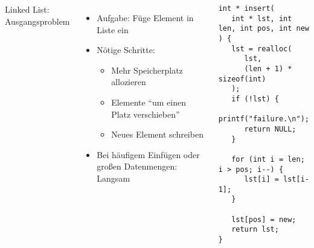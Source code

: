 
\begin{frame}[fragile]
%
\begin{columns}[T]
\begin{Large}
Linked List: Ausgangsproblem
\vspace{10pt}
\end{Large}
%
\begin{itemize}
\item Aufgabe: Füge Element in Liste ein
\item Nötige Schritte:
	\begin{itemize}
	\item Mehr Speicherplatz allozieren
	\item Elemente \enquote{um einen Platz verschieben}
	\item Neues Element schreiben
	\end{itemize}
\item Bei häufigem Einfügen oder großen Datenmengen: Langsam
\end{itemize}
%
\begin{codebox}
\begin{verbatim}
int * insert(
   int * lst, int len, int pos, int new
) {
   lst = realloc(
      lst, 
      (len + 1) * sizeof(int)
   );
   if (!lst) {
      printf("failure.\n"); 
      return NULL;
   }
   
   for (int i = len; i > pos; i--) {
      lst[i] = lst[i-1];
   }
   
   lst[pos] = new;
   return lst;
}
\end{verbatim}
\end{codebox}
\end{columns}

%
\end{frame}


